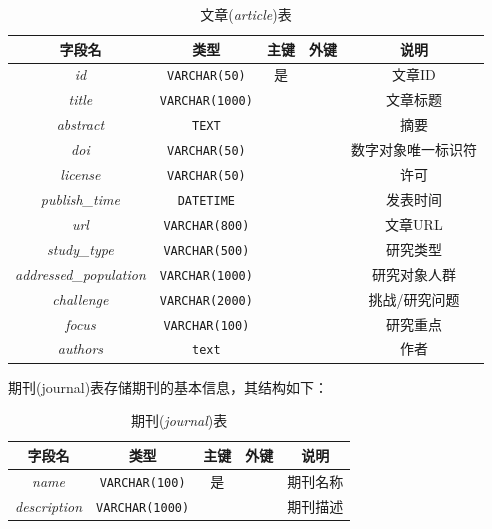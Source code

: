 \documentclass[UTF8,openany]{ctexbook}
\begin{document}
\begin{table}[H]
    \centering
    \begin{tabular}{|c|c|c|c|c|}
        \hline
        \textbf{字段名} & \textbf{类型} & \textbf{主键} & \textbf{外键} & \textbf{说明} \\
        \hline
        \textit{id} & \texttt{VARCHAR(50)} & 是 &  & 文章ID \\
        \hline
        \textit{title} & \texttt{VARCHAR(1000)} &  &  & 文章标题 \\
        \hline
        \textit{abstract} & \texttt{TEXT} &  &  & 摘要 \\
        \hline
        \textit{doi} & \texttt{VARCHAR(50)} &  &  & 数字对象唯一标识符 \\
        \hline
        \textit{license} & \texttt{VARCHAR(50)} &  &  & 许可 \\
        \hline
        \textit{publish\_time} & \texttt{DATETIME} &  &  & 发表时间 \\
        \hline
        \textit{url} & \texttt{VARCHAR(800)} &  &  & 文章URL \\
        \hline
        \textit{study\_type} & \texttt{VARCHAR(500)} &  &  & 研究类型 \\
        \hline
        \textit{addressed\_population} & \texttt{VARCHAR(1000)} &  &  & 研究对象人群 \\
        \hline
        \textit{challenge} & \texttt{VARCHAR(2000)} &  &  & 挑战/研究问题 \\
        \hline
        \textit{focus} & \texttt{VARCHAR(100)} &  &  & 研究重点 \\
        \hline
        \textit{authors} & \texttt{text} &  &  & 作者 \\
        \hline
    \end{tabular}
    \caption{文章(\textit{article})表}
\end{table}

期刊(journal)表存储期刊的基本信息，其结构如下：

\begin{table}[H]
    \centering
    \begin{tabular}{|c|c|c|c|c|}
        \hline
        \textbf{字段名} & \textbf{类型} & \textbf{主键} & \textbf{外键} & \textbf{说明} \\
        \hline
        \textit{name} & \texttt{VARCHAR(100)} & 是 &  & 期刊名称 \\
        \hline
        \textit{description} & \texttt{VARCHAR(1000)} &  &  & 期刊描述 \\
        \hline
    \end{tabular}
    \caption{期刊(\textit{journal})表}
\end{table}
\end{document}
